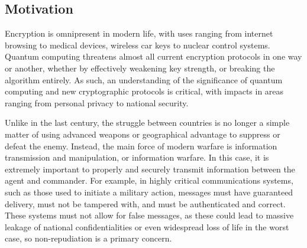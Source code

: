 \documentclass[sigconf]{acmart}
\begin{document}
\subsection{Motivation}
Encryption is omnipresent in modern life, with uses ranging from internet browsing to medical devices, wireless car keys to nuclear control systems. Quantum computing threatens almost all current encryption protocols in one way or another, whether by effectively weakening key strength, or breaking the algorithm entirely. As such, an understanding of the significance of quantum computing and new cryptographic protocols is critical, with impacts in areas ranging from personal privacy to national security.

Unlike in the last century, the struggle between countries is no longer a simple matter of using advanced weapons or geographical advantage to suppress or defeat the enemy. Instead, the main force of modern warfare is information transmission and manipulation, or information warfare.
In this case, it is extremely important to properly and securely transmit information between the agent and commander. For example, in highly critical communications systems, such as those used to initiate a military action, messages must have guaranteed delivery, must not be tampered with, and must be authenticated and correct. These systems must not allow for false messages, as these could lead to massive leakage of national confidentialities or even widespread loss of life in the worst case, so non-repudiation is a primary concern.
 
\end{document}
